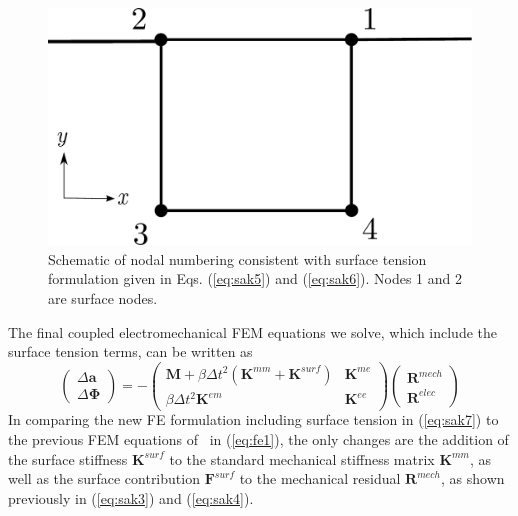 \documentclass[final,authoryear,3p,times,twocolumn]{elsarticle}
\newcommand{\mbf}{\mathbf}
\begin{document}
\begin{figure} \begin{center}
\includegraphics[scale=0.3]{pics/element.pdf}
\caption{Schematic of nodal numbering consistent with surface tension formulation given in Eqs. (\ref{eq:sak5}) and (\ref{eq:sak6}).  Nodes 1 and 2 are surface nodes.}
\label{element} \end{center}
\end{figure}

The final coupled electromechanical FEM equations we solve, which include the surface tension terms, can be written as
\begin{equation}\label{eq:sak7} \left(\begin{array}{cc}{\Delta\mbf{a}} \\ {\Delta\mbf{\Phi}}\end{array}\right)=-\left(\begin{array}{cc} {\mbf{M}+\beta\Delta t^{2}(\mbf{K}^{mm}+\mbf{K}^{surf})} & {\mbf{K}^{me}} \\ {\beta\Delta t^{2}\mbf{K}^{em}} & {\mbf{K}^{ee}} \end{array}\right)\left(\begin{array}{cc}{\mbf{R}^{mech}} \\ {\mbf{R}^{elec}}\end{array}\right)
\end{equation}
In comparing the new FE formulation including surface tension in (\ref{eq:sak7}) to the previous FEM equations of~\citet{parkIJSS2012} in (\ref{eq:fe1}), the only changes are the addition of the surface stiffness $\mbf{K}^{surf}$ to the standard mechanical stiffness matrix $\mbf{K}^{mm}$, as well as the surface contribution $\mbf{F}^{surf}$ to the mechanical residual $\mbf{R}^{mech}$, as shown previously in (\ref{eq:sak3}) and (\ref{eq:sak4}).
\end{document}
